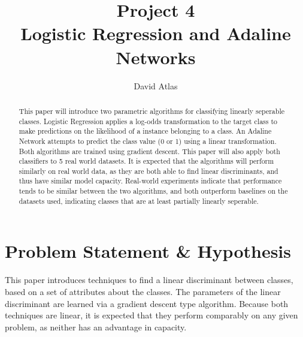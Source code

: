 \documentclass{amsart}
\title{Project 4 \\ Logistic Regression and Adaline Networks}
\author{David Atlas}
\begin{document}
    \begin{abstract}
    This paper will introduce two parametric algorithms for
    classifying linearly seperable classes. Logistic Regression
    applies a log-odds transformation to the target class to make predictions
    on the likelihood of a instance belonging to a class.
    An Adaline Network attempts to predict the class value (0 or 1) using
    a linear transformation. Both algorithms are trained using gradient
    descent. This paper will also apply both classifiers to 5 real
    world datasets. It is expected that the algorithms will perform
    similarly on real world data, as they are both able to find linear
    discriminants, and thus have similar model capacity. Real-world experiments
    indicate that performance tends to be similar between the two algorithms,
    and both outperform baselines on the datasets used, indicating
    classes that are at least partially linearly seperable.
    \end{abstract}

    \maketitle

    \section{Problem Statement \& Hypothesis}
    This paper introduces techniques to find a linear discriminant
    between classes, based on a set of attributes about the classes.
    The parameters of the linear discriminant are learned via a
    gradient descent type algorithm. Because both techniques are linear,
    it is expected that they perform comparably on any given problem, as neither has an
    advantage in capacity.
\end{document}
